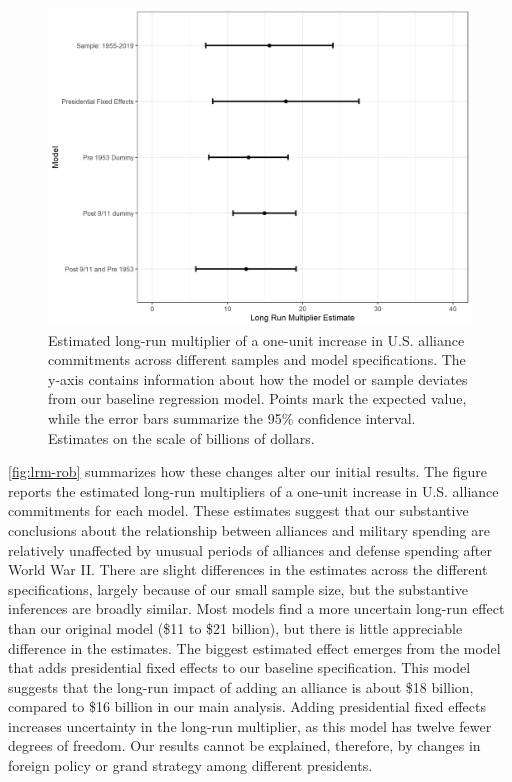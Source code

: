 \documentclass[12pt,hidelinks]{article}
\begin{document}
\begin{figure} 
\includegraphics[width = .95\textwidth]{../figures/lrm-rob.png}
\caption{Estimated long-run multiplier of a one-unit increase in U.S. alliance commitments across different samples and model specifications. 
The y-axis contains information about how the model or sample deviates from our baseline regression model. 
Points mark the expected value, while the error bars summarize the 95\% confidence interval.
Estimates on the scale of billions of dollars. }
\label{fig:lrm-rob}
\end{figure}


\autoref{fig:lrm-rob} summarizes how these changes alter our initial results. 
The figure reports the estimated long-run multipliers of a one-unit increase in U.S. alliance commitments for each model.
These estimates suggest that our substantive conclusions about the relationship between alliances and military spending are relatively unaffected by unusual periods of alliances and defense spending after World War II.
There are slight differences in the estimates across the different specifications, largely because of our small sample size, but the substantive inferences are broadly similar. 
Most models find a more uncertain long-run effect than our original model (\$11 to \$21 billion), but there is little appreciable difference in the estimates.  
The biggest estimated effect emerges from the model that adds presidential fixed effects to our baseline specification.
This model suggests that the long-run impact of adding an alliance is about \$18 billion, compared to \$16 billion in our main analysis. 
Adding presidential fixed effects increases uncertainty in the long-run multiplier, as this model has twelve fewer degrees of freedom. 
Our results cannot be explained, therefore, by changes in foreign policy or grand strategy among different presidents.
\end{document}
